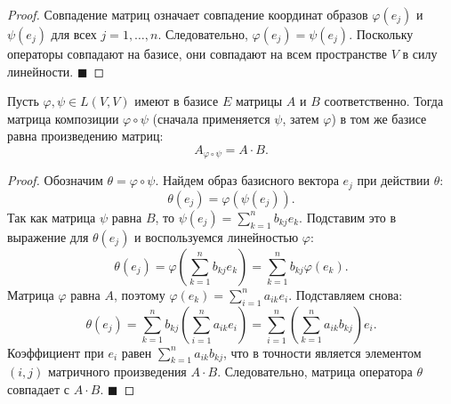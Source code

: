 \begin{proof}
Совпадение матриц означает совпадение координат образов $\varphi(e_j)$ и $\psi(e_j)$ для всех $j=1,\dots,n$. Следовательно, $\varphi(e_j) = \psi(e_j)$. Поскольку операторы совпадают на базисе, они совпадают на всем пространстве $V$ в силу линейности.
\hfill$\blacksquare$
\end{proof}

\begin{theorem}
Пусть $\varphi, \psi \in L(V, V)$ имеют в базисе $E$ матрицы $A$ и $B$ соответственно. Тогда матрица композиции $\varphi \circ \psi$ (сначала применяется $\psi$, затем $\varphi$) в том же базисе равна произведению матриц:
\[
A_{\varphi \circ \psi} = A \cdot B.
\]
\end{theorem}

\begin{proof}
Обозначим $\theta = \varphi \circ \psi$. Найдем образ базисного вектора $e_j$ при действии $\theta$:
\[
\theta(e_j) = \varphi(\psi(e_j)).
\]
Так как матрица $\psi$ равна $B$, то $\psi(e_j) = \sum_{k=1}^n b_{kj} e_k$. Подставим это в выражение для $\theta(e_j)$ и воспользуемся линейностью $\varphi$:
\[
\theta(e_j) = \varphi\left( \sum_{k=1}^n b_{kj} e_k \right) = \sum_{k=1}^n b_{kj} \varphi(e_k).
\]
Матрица $\varphi$ равна $A$, поэтому $\varphi(e_k) = \sum_{i=1}^n a_{ik} e_i$. Подставляем снова:
\[
\theta(e_j) = \sum_{k=1}^n b_{kj} \left( \sum_{i=1}^n a_{ik} e_i \right) = \sum_{i=1}^n \left( \sum_{k=1}^n a_{ik} b_{kj} \right) e_i.
\]
Коэффициент при $e_i$ равен $\sum_{k=1}^n a_{ik} b_{kj}$, что в точности является элементом $(i, j)$ матричного произведения $A \cdot B$. Следовательно, матрица оператора $\theta$ совпадает с $A \cdot B$.
\hfill$\blacksquare$
\end{proof}
